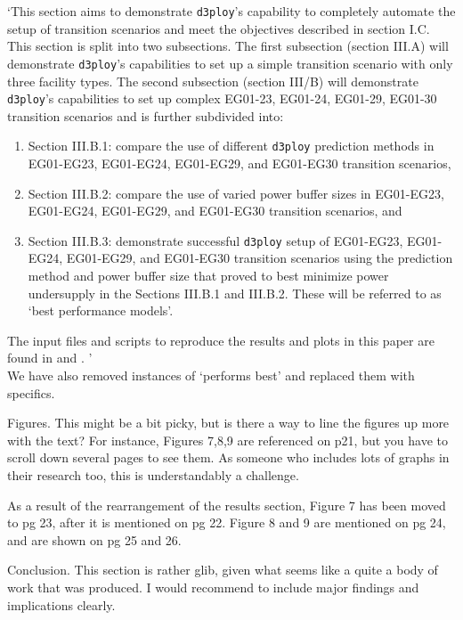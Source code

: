 \documentclass[answers,11pt]{exam}
\newcommand{\deploy}{\texttt{d3ploy}\xspace}%
\begin{document}
\begin{questions}
\begin{solution}
`This section aims to demonstrate \deploy's capability to completely automate the setup of 
transition scenarios and meet the objectives described in section 
I.C. 
This section is split into two subsections. 
The first subsection (section III.A) will demonstrate \deploy's capabilities 
to set up a simple transition scenario with only three facility types. 
The second subsection (section III/B) will demonstrate \deploy's capabilities to
set up complex EG01-23, EG01-24, EG01-29, EG01-30 transition scenarios and is further 
subdivided into:  
\begin{enumerate}
\item Section III.B.1: compare the use of different \deploy prediction methods in EG01-EG23, EG01-EG24, 
EG01-EG29, and EG01-EG30 transition scenarios, 
\item Section III.B.2: compare the use of varied power buffer sizes in EG01-EG23, EG01-EG24, 
EG01-EG29, and EG01-EG30 transition scenarios, and
\item Section III.B.3: demonstrate successful \deploy setup of EG01-EG23, EG01-EG24, 
EG01-EG29, and EG01-EG30 transition scenarios using the prediction method and 
power buffer size that proved to best minimize power undersupply in the Sections 
III.B.1 and III.B.2. 
These will be referred to as `best performance models'. 
\end{enumerate}
The input files and scripts to reproduce the results and plots in this
paper are found in \cite{chee_arfc/d3ploy:_2019} and 
\cite{bae_arfctransition-scenarios_2019}. '
\\

We have also removed instances of `performs best' and replaced them with specifics. 
\end{solution}

\question Figures. This might be a bit picky, but is there a way to line the figures up more with the text? For
instance, Figures 7,8,9 are referenced on p21, but you have to scroll down several pages to see them. As
someone who includes lots of graphs in their research too, this is understandably a challenge.

\begin{solution}
As a result of the rearrangement of the results section, Figure 7 has been moved to pg 23, after 
it is mentioned on pg 22. Figure 8 and 9 are mentioned on pg 24, and are shown on pg 25 and 26.  
\end{solution}

\question Conclusion. This section is rather glib, given what seems like a quite a body of work that was produced.
I would recommend to include major findings and implications clearly.


\end{questions}
\end{document}
